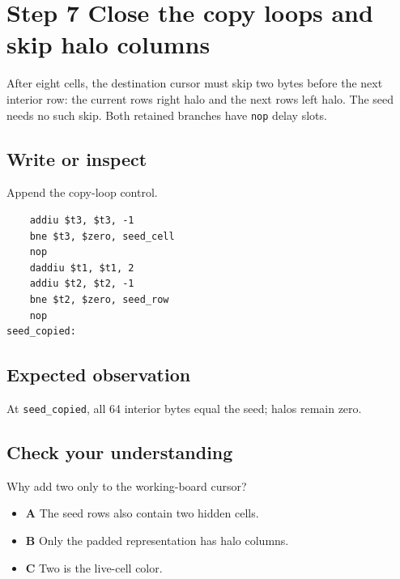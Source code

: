\section{Step 7 Close the copy loops and skip halo
  columns}\label{008-life-generations-s07-step-7-close-the-copy-loops-and-skip-halo-columns}

After eight cells, the destination cursor must skip two bytes before the
next interior row: the current row\textquotesingle s right halo and the
next row\textquotesingle s left halo. The seed needs no such skip. Both
retained branches have \texttt{nop} delay slots.

\subsection{Write or
  inspect}\label{008-life-generations-s07-write-or-inspect}

Append the copy-loop control.

\begin{verbatim}
    addiu $t3, $t3, -1
    bne $t3, $zero, seed_cell
    nop
    daddiu $t1, $t1, 2
    addiu $t2, $t2, -1
    bne $t2, $zero, seed_row
    nop
seed_copied:
\end{verbatim}

\subsection{Expected
  observation}\label{008-life-generations-s07-expected-observation}

At \texttt{seed\_copied}, all 64 interior bytes equal the seed; halos
remain zero.

\subsection{Check your
  understanding}\label{008-life-generations-s07-check-your-understanding}

Why add two only to the working-board cursor?

\begin{itemize}
  \tightlist
  \item
        \textbf{A} The seed rows also contain two hidden cells.
  \item
        \textbf{B} Only the padded representation has halo columns.
  \item
        \textbf{C} Two is the live-cell color.
\end{itemize}
